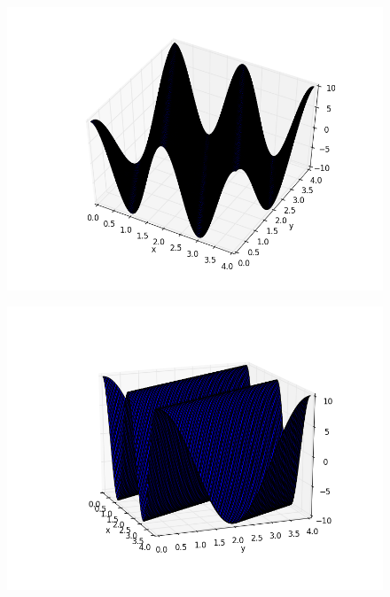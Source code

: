 \documentclass[10pt]{book}
\begin{document}
\begin{figure}[H]
 \centering
 \includegraphics[scale=0.8]{1.png}
\end{figure}

\begin{figure}[H]
 \centering
 \includegraphics[scale=0.8]{2.png}
\end{figure}
\end{document}
